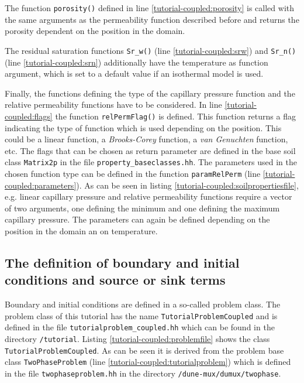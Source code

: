 The function \texttt{porosity()} defined in line \ref{tutorial-coupled:porosity} is called with the same arguments as the permeability function described before and returns the porosity dependent on the position in the domain.

The residual saturation functions \texttt{Sr\_w()} (line \ref{tutorial-coupled:srw}) and \texttt{Sr\_n()} (line \ref{tutorial-coupled:srn}) additionally have the temperature as function argument, which is set to a default value if an isothermal model is used.

Finally, the functions defining the type of the capillary pressure function and the relative permeability functions have to be considered. In line \ref{tutorial-coupled:flags} the function \texttt{relPermFlag()} is defined. This function returns a flag indicating the type of function which is used depending on the position. This could be a linear function, a \textit{Brooks-Corey} function, a \textit{van Genuchten} function, etc. The flags that can be chosen as return parameter are defined in the base soil class \texttt{Matrix2p} in the file \texttt{property\_baseclasses.hh}. The parameters used in the chosen function type can be defined in the function \texttt{paramRelPerm} (line \ref{tutorial-coupled:parameters}). As can be seen in listing \ref{tutorial-coupled:soilpropertiesfile}, e.g. linear capillary pressure and relative permeability functions require a vector of two arguments, one defining the minimum and one defining the maximum capillary pressure. The parameters can again be defined depending on the position in the domain an on temperature.

\subsection{The definition of boundary and initial conditions and source or sink terms}\label{tutorial-coupled:description-bc-ic}

Boundary and initial conditions are defined in a so-called problem class. The problem class of this tutorial has the name \texttt{TutorialProblemCoupled} and is defined in the file \texttt{tutorialproblem\_coupled.hh} which can be found in the directory \texttt{/tutorial}. Listing \ref{tutorial-coupled:problemfile} shows the class \texttt{TutorialProblemCoupled}. As can be seen it is derived from the problem base class \texttt{TwoPhaseProblem} (line \ref{tutorial-coupled:tutorialproblem}) which is defined in the file \texttt{twophaseproblem.hh} in the directory \texttt{/dune-mux/dumux/twophase}.

